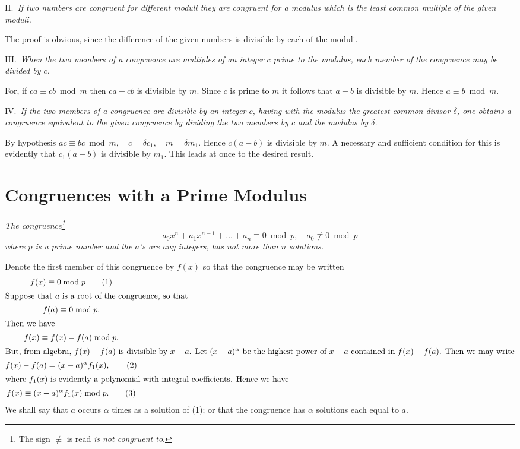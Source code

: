 \documentclass[oneside]{book}
\begin{document}
\smallskip II.~\emph{If two numbers are congruent for different
moduli they are congruent for a modulus which is the least common
multiple of the given moduli.}

The proof is obvious, since the difference of the given numbers is
divisible by each of the moduli.

\smallskip III.~\emph{When the two members of a congruence are
multiples of an integer $c$ prime to the modulus, each member of the
congruence may be divided by $c$.}

For, if $ca \equiv cb \bmod m$ then $ca - cb$ is divisible by $m$.
Since $c$ is prime to $m$ it follows that $a - b$ is divisible by
$m$. Hence $a\equiv b \bmod m$.

\smallskip IV.~\emph{If the two members of a congruence are
divisible by an integer $c$, having with the modulus the greatest
common divisor $\delta$, one obtains a congruence equivalent to the
given congruence by dividing the two members by $c$ and the modulus
by $\delta$.}

By hypothesis $ac \equiv bc \bmod m,\quad c = \delta c_1,\quad m =
\delta m_1$. Hence $c(a-b)$ is divisible by $m$. A necessary and
sufficient condition for this is evidently that $c_1(a-b)$ is
divisible by $m_1$. This leads at once to the desired result.

\section{Congruences with a Prime Modulus}\label{s21}%

\emph{The congruence\footnote{The sign $\not\equiv$ is read \emph{is
not congruent to}.}}
\begin{equation*}
a_0 x^n + a_1 x^{n-1} + \ldots + a_n \equiv 0 \bmod p,
  \quad a_0 \not\equiv 0 \bmod p
\end{equation*}
\emph{where $p$ is a prime number and the $a$'s are any integers,
has not more than $n$ solutions.}

Denote the first member of this congruence by $f(x)$ so that the
congruence may be written
\begin{gather}
f(x) \equiv 0 \bmod p \tag{1} \\
\intertext{Suppose that $a$ is a root of the congruence, so that}
f(a) \equiv 0 \bmod p. \notag \\
\intertext{Then we have} f(x)
\equiv f(x) - f(a) \bmod p. \notag \\
\intertext{But, from algebra, $f(x) - f(a)$ is divisible by $x - a$.
Let $(x-a)^{\alpha}$ be the highest power of $x - a$ contained in
$f(x) - f(a)$. Then we may write}
f(x) - f(a) = (x - a)^{\alpha} f_1(x), \tag{2} \\
\intertext{where $f_1(x)$ is evidently a polynomial with integral
coefficients. Hence we have}
f(x) \equiv (x - a)^{\alpha} f_1(x) \bmod p. \tag{3}
\end{gather}
We shall say that $a$ occurs $\alpha$ times as a solution of (1); or
that the congruence has $\alpha$ solutions each equal to $a$.
\end{document}
